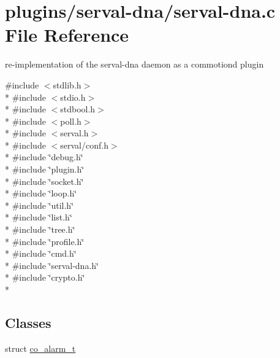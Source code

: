 \hypertarget{serval-dna_8c}{\section{plugins/serval-\/dna/serval-\/dna.c File Reference}
\label{serval-dna_8c}
}


re-\/implementation of the serval-\/dna daemon as a commotiond plugin  


{\ttfamily \#include $<$stdlib.\-h$>$}\\*
{\ttfamily \#include $<$stdio.\-h$>$}\\*
{\ttfamily \#include $<$stdbool.\-h$>$}\\*
{\ttfamily \#include $<$poll.\-h$>$}\\*
{\ttfamily \#include $<$serval.\-h$>$}\\*
{\ttfamily \#include $<$serval/conf.\-h$>$}\\*
{\ttfamily \#include \char`\"{}debug.\-h\char`\"{}}\\*
{\ttfamily \#include \char`\"{}plugin.\-h\char`\"{}}\\*
{\ttfamily \#include \char`\"{}socket.\-h\char`\"{}}\\*
{\ttfamily \#include \char`\"{}loop.\-h\char`\"{}}\\*
{\ttfamily \#include \char`\"{}util.\-h\char`\"{}}\\*
{\ttfamily \#include \char`\"{}list.\-h\char`\"{}}\\*
{\ttfamily \#include \char`\"{}tree.\-h\char`\"{}}\\*
{\ttfamily \#include \char`\"{}profile.\-h\char`\"{}}\\*
{\ttfamily \#include \char`\"{}cmd.\-h\char`\"{}}\\*
{\ttfamily \#include \char`\"{}serval-\/dna.\-h\char`\"{}}\\*
{\ttfamily \#include \char`\"{}crypto.\-h\char`\"{}}\\*
\subsection*{Classes}
\begin{DoxyCompactItemize}
\item 
struct \hyperlink{structco__alarm__t}{co\-\_\-alarm\-\_\-t}
\end{DoxyCompactItemize}
